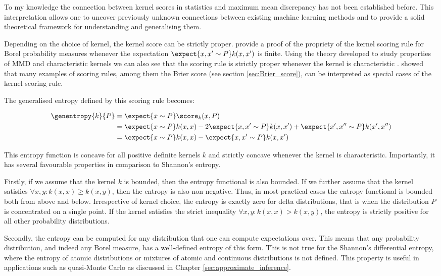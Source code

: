 To my knowledge the connection between kernel scores in statistics and maximum mean discrepancy has not been established before. This interpretation allows one to uncover previously unknown connections between existing machine learning methods and to provide a solid theoretical framework for understanding and generalising them.

Depending on the choice of kernel, the kernel score can be strictly proper. \citep{Gneiting2007} provide a proof of the propriety of the kernel scoring rule for Borel probability measures whenever the expectation $\expect{x,x'\sim P} k(x,x')$ is finite. Using the theory developed to study properties of MMD and characteristic kernels we can also see that the scoring rule is strictly proper whenever the kernel is characteristic \citep{Sriperumbudur2008}. \citet{Gneiting2007} showed that many examples of scoring rules, among them the Brier score (see section \ref{sec:Brier_score}), can be interpreted as special cases of the kernel scoring rule.

The generalised entropy defined by this scoring rule becomes:

\begin{align}
	\genentropy{k}{P} &= \expect{x\sim P} \score_{k}(x,P) \\
		&= \expect{x\sim P} k(x,x) - 2 \expect{x,x'\sim P} k(x,x') + \expect{x',x''\sim P}k(x',x'')\\
		&= \expect{x\sim P} k(x,x) - \expect{x,x'\sim P} k(x,x')
\end{align}

This entropy function is concave for all positive definite kernels $k$ and strictly concave whenever the kernel is characteristic. Importantly, it has several favourable properties in comparison to Shannon's entropy.

Firstly, if we assume that the kernel $k$ is bounded, then the entropy functional is also bounded. If we further assume that the kernel satisfies $\forall x,y: k(x,x)\geq k(x,y)$, then the entropy is also non-negative. Thus, in most practical cases the entropy functional is bounded both from above and below. Irrespective of kernel choice, the entropy is exactly zero for delta distributions, that is when the distribution $P$ is concentrated on a single point. If the kernel satisfies the strict inequality $\forall x,y: k(x,x) > k(x,y)$, the entropy is strictly positive for all other probability distributions.

Secondly, the entropy can be computed for any distribution that one can compute expectations over. This means that any probability distribution, and indeed any Borel measure, has a well-defined entropy of this form. This is not true for the Shannon's differential entropy, where the entropy of atomic distributions or mixtures of atomic and continuous distributions is not defined. This property is useful in applications such as quasi-Monte Carlo as discussed in Chapter \ref{sec:approximate_inference}.

